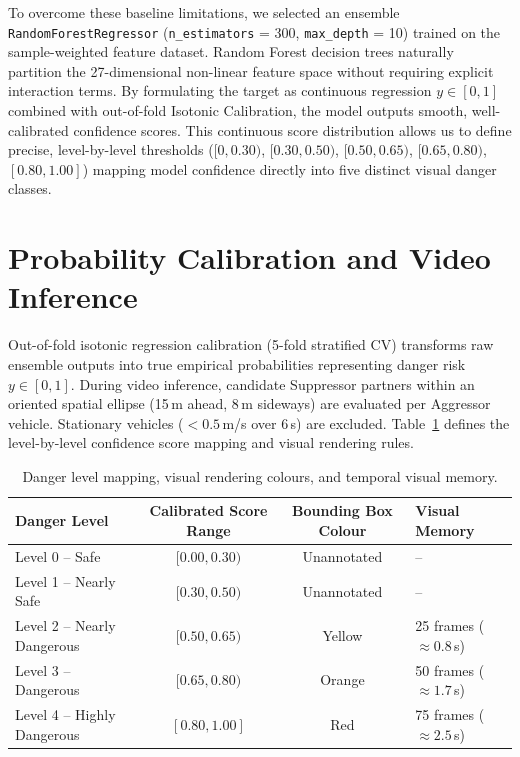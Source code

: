 \documentclass[12pt,a4paper]{report}
\begin{document}
To overcome these baseline limitations, we selected an ensemble \texttt{RandomForestRegressor} (\texttt{n\_estimators} = 300, \texttt{max\_depth} = 10) trained on the sample-weighted feature dataset. Random Forest decision trees naturally partition the 27-dimensional non-linear feature space without requiring explicit interaction terms. By formulating the target as continuous regression $y \in [0, 1]$ combined with out-of-fold Isotonic Calibration, the model outputs smooth, well-calibrated confidence scores. This continuous score distribution allows us to define precise, level-by-level thresholds ($[0, 0.30)$, $[0.30, 0.50)$, $[0.50, 0.65)$, $[0.65, 0.80)$, $[0.80, 1.00]$) mapping model confidence directly into five distinct visual danger classes.

\section{Probability Calibration and Video Inference}

Out-of-fold isotonic regression calibration (5-fold stratified CV) transforms raw ensemble outputs into true empirical probabilities representing danger risk $y \in [0, 1]$. During video inference, candidate Suppressor partners within an oriented spatial ellipse (15\,m ahead, 8\,m sideways) are evaluated per Aggressor vehicle. Stationary vehicles ($< 0.5$\,m/s over 6\,s) are excluded. Table~\ref{tab:danger_levels} defines the level-by-level confidence score mapping and visual rendering rules.

\begin{table}[H]
\centering
\caption{Danger level mapping, visual rendering colours, and temporal visual memory.}
\label{tab:danger_levels}
\begin{tabular}{l c c l}
\toprule
\textbf{Danger Level} & \textbf{Calibrated Score Range} & \textbf{Bounding Box Colour} & \textbf{Visual Memory} \\
\midrule
Level 0 -- Safe             & $[0.00, 0.30)$ & Unannotated & -- \\
Level 1 -- Nearly Safe      & $[0.30, 0.50)$ & Unannotated & -- \\
Level 2 -- Nearly Dangerous & $[0.50, 0.65)$ & Yellow      & 25 frames ($\approx 0.8$\,s) \\
Level 3 -- Dangerous        & $[0.65, 0.80)$ & Orange      & 50 frames ($\approx 1.7$\,s) \\
Level 4 -- Highly Dangerous & $[0.80, 1.00]$ & Red         & 75 frames ($\approx 2.5$\,s) \\
\bottomrule
\end{tabular}
\end{table}
\end{document}
